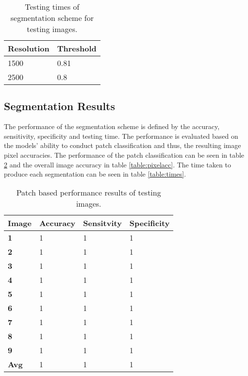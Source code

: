 \begin{table}[H]
\centering
\caption{Testing times of segmentation scheme for testing images.}

\begin{tabular}{|l|l|}
\hline
\textbf{Resolution}	& \textbf{Threshold}\\
\hline
1500	 	& 	0.81\\
\hline 
2500 & 0.8\\
\hline				    	 			   			    	 
\end{tabular}
\label{table:reslevel}
\end{table}
 
\subsection{Segmentation Results}
\label{sect:quant}
The performance of the segmentation scheme is defined by the accuracy, sensitivity, specificity and testing time. The performance is evaluated based on the models' ability to conduct patch classification and thus, the resulting image pixel accuracies. The performance of the patch classification can be seen in table \ref{table:patchacc} and the overall image accuracy in table \ref{table:pixelacc}. The time taken to produce each segmentation can be seen in table \ref{table:times}.


\begin{table}[H]
\centering
\caption{Patch based performance results of testing images.}

\begin{tabular}{|l|l|l|l|}
\hline
\textbf{Image}	& \textbf{Accuracy} & \textbf{Sensitvity} & \textbf{Specificity}\\
\hline
\textbf{1}		& 1		& 1		& 1\\ 
\hline
\textbf{2} 		& 1		& 1		& 1	\\
\hline
\textbf{3}		& 1		& 1		& 1	\\
\hline
\textbf{4}		& 1		& 1		& 1	\\
\hline
\textbf{5}		& 1		& 1		& 1	\\
\hline
\textbf{6} 		& 1		& 1		& 1	\\
\hline
\textbf{7}		& 1		& 1		& 1	\\
\hline
\textbf{8}		& 1		& 1		& 1\\
\hline
\textbf{9} 		& 1		& 1		& 1\\
\hline				    	 			 
\hline
\textbf{Avg}		&1		& 1		& 1\\ 
\hline		    	 
\end{tabular}
\label{table:patchacc}
\end{table}

